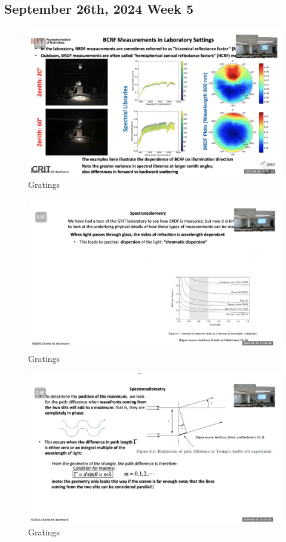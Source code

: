 \documentclass{article}
\begin{document}
\subsection{September 26th, 2024 Week 5}
\begin{figure}[h!]
\centering
\includegraphics[scale=.4]{Radiometry/Week5/Notes/Gratings/MUM1.png}
\caption{Gratings}
\label{fig:Blackbody}
\end{figure}

\begin{figure}[h!]
\centering
\includegraphics[scale=.4]{Radiometry/Week5/Notes/Gratings/MUM2.png}
\caption{Gratings}
\label{fig:Blackbody}
\end{figure}


\begin{figure}[h!]
\centering
\includegraphics[scale=.4]{Radiometry/Week5/Notes/Gratings/MUM3.png}
\caption{Gratings}
\label{fig:Blackbody}
\end{figure}
\end{document}
